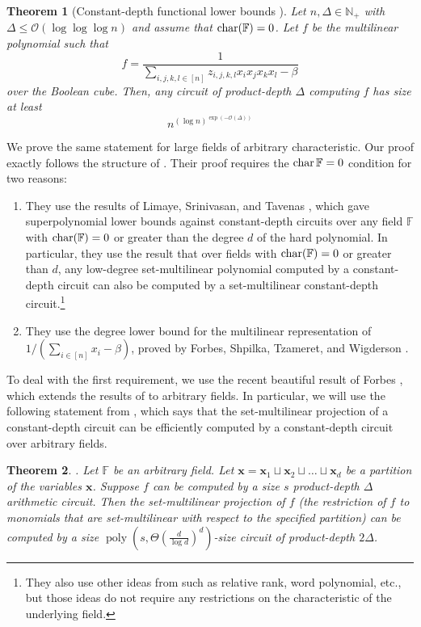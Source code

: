 \documentclass[11pt]{article}
\newtheorem{theorem}{Theorem}[section]
\newcommand{\poly}{\mathop{\mathrm{poly}}}
\newcommand{\F}{\mathbb{F}}
\begin{document}
\begin{theorem}[Constant-depth functional lower bounds \cite{GHT}]\label{thm: ght}
    Let $n, \Delta \in \mathbb{N}_{+}$ with $\Delta \leq \mathcal{O}(\log\log\log n)$ and assume that $\char(\bbF)=0$. Let $f$ be the multilinear polynomial such that $$ f = \frac{1}{\sum_{i,j,k,l\in[n]}z_{i,j,k,l}x_ix_jx_kx_l - \beta}$$
    over the Boolean cube. Then, any circuit of product-depth $\Delta$ computing $f$ has size at least $$n^{(\log n)^{\exp(-\mathcal{O}(\Delta))}}$$
\end{theorem}

We prove the same statement for large fields of arbitrary characteristic. Our proof exactly follows the structure of \cite{GHT}. Their proof requires the $\char\bbF = 0$ condition for two reasons:
\begin{enumerate}
    \item They use the results of Limaye, Srinivasan, and Tavenas \cite{LST}, which gave superpolynomial lower bounds against constant-depth circuits over any field $\F$ with $\char(\F) = 0$ or greater than the degree $d$ of the hard polynomial. In particular, they use the result that over fields with $\char(\F)=0$ or greater than $d$, any low-degree set-multilinear polynomial computed by a constant-depth circuit can also be computed by a set-multilinear constant-depth circuit.\footnote{They also use other ideas from \cite{LST} such as relative rank, word polynomial, etc., but those ideas do not require any restrictions on the characteristic of the underlying field.}
    \item They use the degree lower bound for the multilinear representation of $1/(\sum_{i\in[n]}x_i - \beta)$, proved by Forbes, Shpilka, Tzameret, and Wigderson \cite{FSTW21}.
\end{enumerate}

To deal with the first requirement, we use the recent beautiful result of Forbes \cite{Forbes-LST-CCC}, which extends the results of \cite{LST} to arbitrary fields. In particular, we will use the following statement from \cite{Forbes-LST-CCC}, which says that the set-multilinear projection of a constant-depth circuit can be efficiently computed by a constant-depth circuit over arbitrary fields. 
\begin{theorem}
   \cite[Corollary 27]{Forbes-LST-CCC}. Let $\F$ be an arbitrary field. Let $\mathbf{x} = \mathbf{x}_1 \sqcup \mathbf{x}_2 \sqcup \dots \sqcup \mathbf{x}_d$ be a partition of the variables $\mathbf{x}$. Suppose $f$ can be computed by a size $s$ product-depth $\Delta$ arithmetic circuit. Then the set-multilinear projection of $f$ (the restriction of $f$ to monomials that are set-multilinear with respect to the specified partition) can be computed by a size $\poly(s,\Theta(\frac{d}{\log d})^d)$-size circuit of product-depth $2\Delta$. 
\end{theorem}
\end{document}
